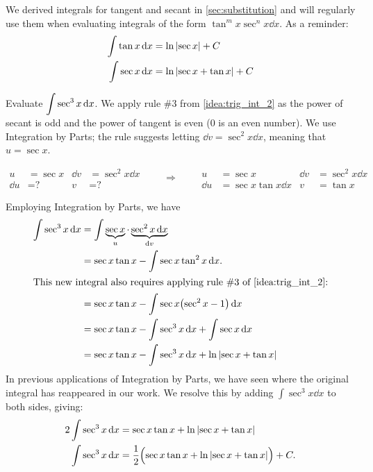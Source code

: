 We derived integrals for tangent and secant in \autoref{sec:substitution} and will regularly use them when evaluating integrals of the form $\tan^m x \sec^n x \dd x$.  As a reminder:
\begin{align*}
 \int\tan x\operatorname{d}\! x &=\ln\left\lvert \sec x \right\rvert+C \\
 \int\sec x\operatorname{d}\! x &=\ln\left\lvert \sec x+\tan x \right\rvert+C
\end{align*}

\begin{example}\label{ex_trigint6}%
Evaluate $\displaystyle\int \sec^3x\operatorname{d}\! x$.
\solution
We apply rule \#3 from \autoref{idea:trig_int_2} as the power of secant is odd and the power of tangent is even (0 is an even number). We use Integration by Parts; the rule suggests letting $\dd v = \sec^2x\dd x$, meaning that $u = \sec x$. \\
\noindent\begin{minipage}[t]{\linewidth}\noindent%
\captionsetup{type=figure}%
\[
\begin{aligned}
u&= \sec x & \dd v&=\sec^2 x\dd x\\
\dd u&= \text{?} & v&=\text{?}
\end{aligned}
\qquad\Rightarrow\qquad
\begin{aligned}
u&= \sec x & \dd v&=\sec^2 x\dd x\\
\dd u&= \sec x\tan x\dd x & v&=\tan x
\end{aligned}
\]
\caption{Setting up Integration by Parts.}\label{fig:trigint1}\tagstructend
\end{minipage}

Employing Integration by Parts, we have
\begin{align*}
\int \sec^3x\dd x
 	&=	\int \underbrace{\sec x}_u\cdot\underbrace{\sec^2 x\dd x}_{\dd v}\\
	&=	\sec x\tan x - \int \sec x\tan^2x\dd x. \\
\intertext{This new integral also requires applying rule \#3 of \autoref{idea:trig_int_2}:}
	&= \sec x\tan x - \int \sec x \bigl(\sec^2 x-1\bigr)\dd x\\
	&=	\sec x\tan x - \int \sec^3x\dd x + \int \sec x\dd x \\
	&= \sec x\tan x -\int \sec^3x\dd x + \ln\abs{\sec x+\tan x}
\end{align*}
In previous applications of Integration by Parts, we have seen where the original integral has reappeared in our work. We resolve this by adding $\int \sec^3x\dd x$ to both sides, giving:
\begin{align*}
2\int \sec^3x\operatorname{d}\! x &= \sec x\tan x + \ln\left\lvert \sec x+\tan x \right\rvert \\
\int \sec^3x\operatorname{d}\! x &= \frac12\Bigl(\sec x\tan x + \ln\left\lvert \sec x+\tan x \right\rvert\Bigr)+C.
\end{align*}
\end{example}

